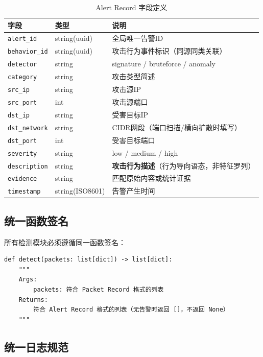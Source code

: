 \documentclass[12pt,a4paper]{ctexart}
\begin{document}
\begin{table}[H]
\centering
\caption{Alert Record 字段定义}
\small
\begin{tabular}{@{}lp{2.5cm}p{7.5cm}@{}}
\toprule
字段 & 类型 & 说明 \\
\midrule
\texttt{alert\_id}    & string(uuid) & 全局唯一告警ID \\
\texttt{behavior\_id}  & string(uuid) & 攻击行为事件标识（同源同类关联） \\
\texttt{detector}      & string & signature / bruteforce / anomaly \\
\texttt{category}      & string & 攻击类型简述 \\
\texttt{src\_ip}       & string & 攻击源IP \\
\texttt{src\_port}     & int    & 攻击源端口 \\
\texttt{dst\_ip}       & string & 受害目标IP \\
\texttt{dst\_network}   & string & CIDR网段（端口扫描/横向扩散时填写） \\
\texttt{dst\_port}     & int    & 受害目标端口 \\
\texttt{severity}      & string & low / medium / high \\
\texttt{description}   & string & \textbf{攻击行为描述}（行为导向语态，非特征罗列） \\
\texttt{evidence}      & string & 匹配原始内容或统计证据 \\
\texttt{timestamp}     & string(ISO8601) & 告警产生时间 \\
\bottomrule
\end{tabular}
\end{table}

\subsection{统一函数签名}

所有检测模块必须遵循同一函数签名：

\begin{lstlisting}
def detect(packets: list[dict]) -> list[dict]:
    """
    Args:
        packets: 符合 Packet Record 格式的列表
    Returns:
        符合 Alert Record 格式的列表（无告警时返回 []，不返回 None）
    """
\end{lstlisting}

\subsection{统一日志规范}
\end{document}
